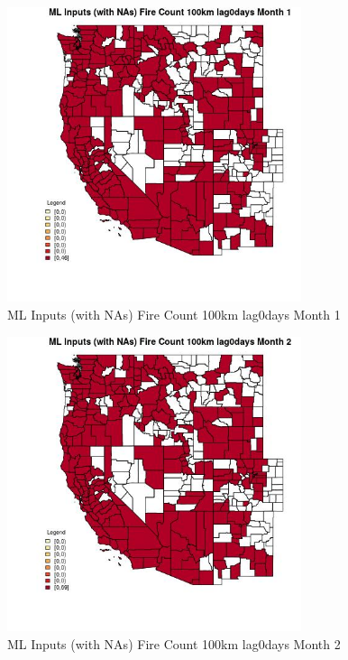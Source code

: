 \begin{figure} 
\centering  
\includegraphics[width=0.77\textwidth]{Code_Outputs/Report_ML_input_PM25_Step4_part_e_de_duplicated_aves_compiled_2019-05-20wNAs_CountyFire_Count_100km_lag0daysmedianMonth1.jpg} 
\caption{\label{fig:Report_ML_input_PM25_Step4_part_e_de_duplicated_aves_compiled_2019-05-20wNAsCountyFire_Count_100km_lag0daysmedianMonth1}ML Inputs (with NAs) Fire Count 100km lag0days Month 1} 
\end{figure} 
 

\begin{figure} 
\centering  
\includegraphics[width=0.77\textwidth]{Code_Outputs/Report_ML_input_PM25_Step4_part_e_de_duplicated_aves_compiled_2019-05-20wNAs_CountyFire_Count_100km_lag0daysmedianMonth2.jpg} 
\caption{\label{fig:Report_ML_input_PM25_Step4_part_e_de_duplicated_aves_compiled_2019-05-20wNAsCountyFire_Count_100km_lag0daysmedianMonth2}ML Inputs (with NAs) Fire Count 100km lag0days Month 2} 
\end{figure} 
 

